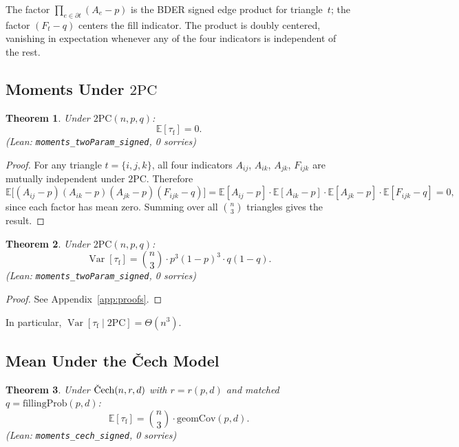 \documentclass[reqno,12pt]{amsart}
\newcommand{\tauf}{\tau_{\mathrm{f}}}
\newcommand{\PC}{\mathrm{2PC}}
\newcommand{\Cech}{\ifmmode\text{\v{C}ech}\else\v{C}ech\fi}  %
\newcommand{\geomCov}{\mathrm{geomCov}}
\newcommand{\fillingP}{\mathrm{fillingProb}}
\newcommand{\EE}{\mathbb{E}}
\DeclareMathOperator{\Var}{Var}
\newcommand{\leanverified}[1]{\textup{(Lean: \texttt{#1}, 0 sorries)}}
\theoremstyle{plain}
\newtheorem{theorem}{Theorem}[section]
\theoremstyle{definition}
\theoremstyle{remark}
\begin{document}
The factor $\prod_{e\in\partial t}(A_e - p)$ is the BDER signed edge product for
triangle~$t$; the factor $(F_t - q)$ centers the fill indicator. The product is doubly
centered, vanishing in expectation whenever any of the four indicators is independent of the
rest.

\subsection{Moments Under \texorpdfstring{$\PC$}{2PC}}

\begin{theorem}\label{thm:mean-twopc}
Under $\PC(n,p,q)$:
\begin{equation}\label{eq:mean-twopc}
  \EE[\tauf] = 0.
\end{equation}
\hfill \leanverified{moments\_twoParam\_signed}
\end{theorem}

\begin{proof}
For any triangle $t = \{i,j,k\}$, all four indicators $A_{ij}$, $A_{ik}$, $A_{jk}$,
$F_{ijk}$ are mutually independent under $\PC$. Therefore
\[
  \EE\!\bigl[(A_{ij}-p)(A_{ik}-p)(A_{jk}-p)(F_{ijk}-q)\bigr]
  = \EE[A_{ij}-p]\cdot\EE[A_{ik}-p]\cdot\EE[A_{jk}-p]\cdot\EE[F_{ijk}-q] = 0,
\]
since each factor has mean zero. Summing over all $\binom{n}{3}$ triangles gives the result.
\end{proof}

\begin{theorem}\label{thm:var-twopc}
Under $\PC(n,p,q)$:
\begin{equation}\label{eq:var-twopc}
  \Var[\tauf] = \binom{n}{3}\cdot p^3(1-p)^3\cdot q(1-q).
\end{equation}
\hfill \leanverified{moments\_twoParam\_signed}
\end{theorem}

\begin{proof}
See Appendix~\ref{app:proofs}.
\end{proof}

In particular, $\Var[\tauf\mid \PC] = \Theta(n^3)$.

\subsection{Mean Under the \v{C}ech Model}

\begin{theorem}\label{thm:mean-cech}
Under $\Cech(n,r,d)$ with $r = r(p,d)$ and matched $q = \fillingP(p,d)$:
\begin{equation}\label{eq:mean-cech}
  \EE[\tauf] = \binom{n}{3}\cdot\geomCov(p,d).
\end{equation}
\hfill \leanverified{moments\_cech\_signed}
\end{theorem}
\end{document}
